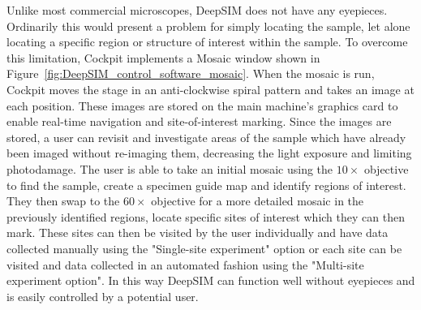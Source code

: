 Unlike most commercial microscopes, DeepSIM does not have any eyepieces. Ordinarily this would present a problem for simply locating the sample, let alone locating a specific region or structure of interest within the sample. To overcome this limitation, Cockpit implements a Mosaic window shown in Figure~\ref{fig:DeepSIM_control_software_mosaic}. When the mosaic is run, Cockpit moves the stage in an anti-clockwise spiral pattern and takes an image at each position. These images are stored on the main machine's graphics card to enable real-time navigation and site-of-interest marking. Since the images are stored, a user can revisit and investigate areas of the sample which have already been imaged without re-imaging them, decreasing the light exposure and limiting photodamage. The user is able to take an initial mosaic using the $10\times$ objective to find the sample, create a specimen guide map and identify regions of interest. They then swap to the $60\times$ objective for a more detailed mosaic in the previously identified regions, locate specific sites of interest which they can then mark. These sites can then be visited by the user individually and have data collected manually using the "Single-site experiment" option or each site can be visited and data collected in an automated fashion using the "Multi-site experiment option". In this way DeepSIM can function well without eyepieces and is easily controlled by a potential user.
